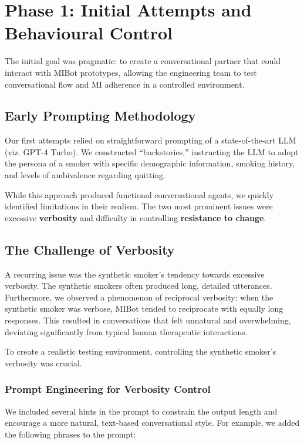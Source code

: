 \section{Phase 1: Initial Attempts and Behavioural Control}
The initial goal was pragmatic: to create a conversational partner that could interact with MIBot prototypes, allowing the engineering team to test conversational flow and MI adherence in a controlled environment.

\subsection{Early Prompting Methodology}
Our first attempts relied on straightforward prompting of a state-of-the-art LLM (viz. GPT-4 Turbo). We constructed ``backstories,'' instructing the LLM to adopt the persona of a smoker with specific demographic information, smoking history, and levels of ambivalence regarding quitting.


While this approach produced functional conversational agents, we quickly identified limitations in their realism. The two most prominent issues were excessive \textbf{verbosity} and difficulty in controlling \textbf{resistance to change}.

\subsection{The Challenge of Verbosity}
A recurring issue was the synthetic smoker's tendency towards excessive verbosity. The synthetic smokers often produced long, detailed utterances. Furthermore, we observed a phenomenon of reciprocal verbosity: when the synthetic smoker was verbose, MIBot tended to reciprocate with equally long responses. This resulted in conversations that felt unnatural and overwhelming, deviating significantly from typical human therapeutic interactions.

To create a realistic testing environment, controlling the synthetic smoker's verbosity was crucial.

\subsubsection*{Prompt Engineering for Verbosity Control}
We included several hints in the prompt to constrain the output length and encourage a more natural, text-based conversational style. For example, we added the following phrases to the prompt:

